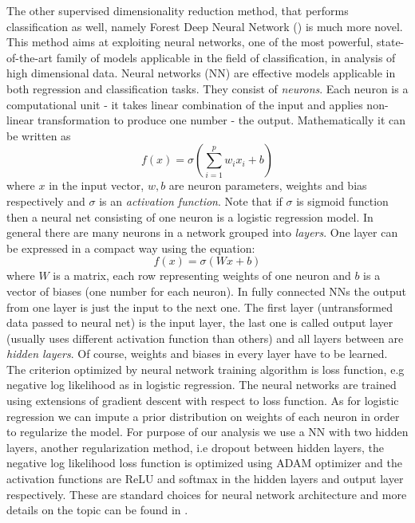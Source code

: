 \documentclass[12pt, wide]{mwart}
\begin{document}
The other supervised dimensionality reduction method, that performs classification as well, namely Forest Deep Neural Network (\cite{fDNN}) is much more novel. This method aims at exploiting neural networks, one of the most powerful, state-of-the-art family of models applicable in the field of classification, in analysis of high dimensional data. Neural networks (NN) are effective models applicable in both regression and classification tasks. They consist of \textit{neurons}. Each neuron is a computational unit -  it takes linear combination of the input and applies non-linear transformation to produce one number - the output. Mathematically it can be written as $$f(x) = \sigma \left(\sum_{i=1}^p w_ix_i + b\right)$$where $x$ in the input vector, $w,b$ are neuron parameters, weights and bias respectively and $\sigma$ is an \textit{activation function}. Note that if $\sigma$ is sigmoid function then a neural net consisting of one neuron is a logistic regression model. In general there are many neurons in a network grouped into \textit{layers}. One layer can be expressed in a compact way using the equation: $$ f(x) = \sigma \left(Wx + b\right)$$where $W$ is a matrix, each row representing weights of one neuron and $b$ is a vector of biases (one number for each neuron). In fully connected NNs the output from one layer is just the input to the next one. The first layer (untransformed data passed to neural net) is the input layer, the last one is called output layer (usually uses different activation function than others) and all layers between are \textit{hidden layers}. Of course, weights and biases in every layer have to be learned. The criterion optimized by neural network training algorithm is loss function, e.g negative log likelihood as in logistic regression. The neural networks are trained using extensions of gradient descent with respect to loss function. As for logistic regression we can impute a prior distribution on weights of each neuron in order to regularize the model. For purpose of our analysis we use a NN with two hidden layers, another regularization method, i.e dropout between hidden layers, the negative log likelihood loss function is optimized using ADAM optimizer and the activation functions are ReLU and softmax in the hidden layers and output layer respectively. These are standard choices for neural network architecture and more details on the topic can be found in \cite{deeplearning}.
\end{document}
